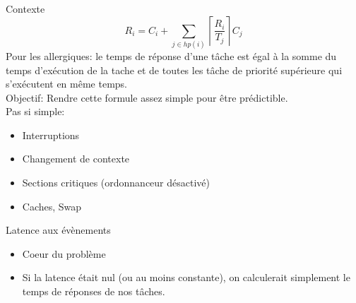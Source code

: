 \begin{frame}{Contexte}
  $$
  R_i = C_i + \sum_{j \in hp(i)} \left\lceil\frac{R_i}{T_j}\right\rceil C_j
  $$
  Pour les allergiques: le temps de  réponse d'une tâche est égal à la
  somme du temps d'exécution de la tache et de toutes les tâche de
  priorité supérieure qui s'exécutent en même temps.\\[1.5ex]
  Objectif: Rendre cette formule assez simple pour être prédictible.\\[1.5ex]
  Pas si simple:
  \begin{itemize}
  \item Interruptions
  \item Changement de contexte
  \item Sections critiques (ordonnanceur désactivé)
  \item Caches, Swap
  \end{itemize}
\end{frame}

\begin{frame}{Latence aux évènements}
  \begin{itemize}
  \item Coeur du problème
  \item  Si  la  latence  était   nul  (ou  au  moins  constante),  on
    calculerait simplement le temps de réponses de nos tâches.
  \end{itemize}

  \begin{center}
  \end{center}
\end{frame}

